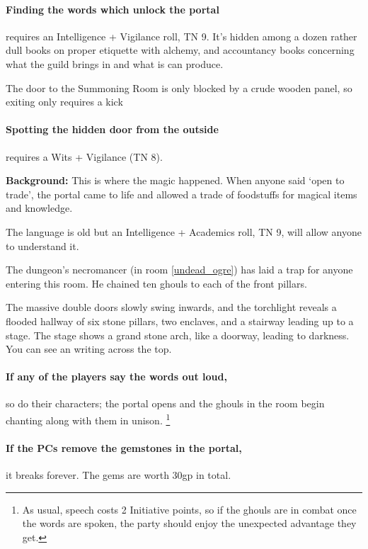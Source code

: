 \paragraph{Finding the words which unlock the portal}
requires an Intelligence + Vigilance roll, TN 9.
It's hidden among a dozen rather dull books on proper etiquette with alchemy, and accountancy books concerning what the guild brings in and what is can produce.

The door to the Summoning Room is only blocked by a crude wooden panel, so exiting only requires a kick

\paragraph{Spotting the hidden door from the outside}
requires a Wits + Vigilance (TN 8).


\textbf{Background:}
This is where the magic happened.
When anyone said `open to trade', the portal came to life and allowed a trade of foodstuffs for magical items and knowledge.

The language is old but an Intelligence + Academics roll, TN 9, will allow anyone to understand it.

The dungeon's necromancer (in room \ref{undead_ogre}) has laid a trap for anyone entering this room.
He chained ten ghouls to each of the front pillars.


\begin{boxtext}

  The massive double doors slowly swing inwards, and the torchlight reveals a flooded hallway of six stone pillars, two enclaves, and a stairway leading up to a stage.
  The stage shows a grand stone arch, like a doorway, leading to darkness.
  You can see an writing across the top.

\end{boxtext}

\paragraph{If any of the players say the words out loud,}
so do their characters; the portal opens and the ghouls in the room begin chanting along with them in unison.%
\footnote{As usual, speech costs 2 Initiative points, so if the ghouls are in combat once the words are spoken, the party should enjoy the unexpected advantage they get.}

\paragraph{If the PCs remove the gemstones in the portal,}
it breaks forever.
The gems are worth 30gp in total.


